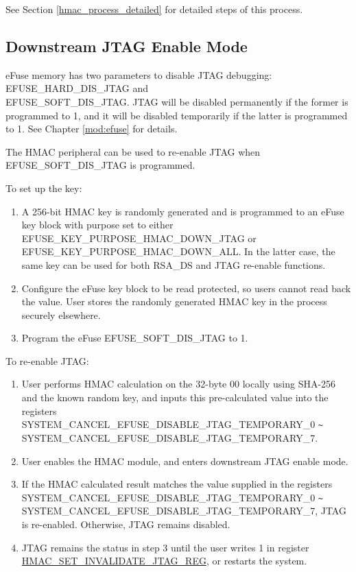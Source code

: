 \documentclass[main\_\_EN.tex]{subfiles}
\begin{document}
See Section \ref{hmac_process_detailed} for detailed steps of this process.


\subsection{Downstream JTAG Enable Mode}

eFuse memory has two parameters to disable JTAG debugging: EFUSE\_HARD\_DIS\_JTAG and\\ EFUSE\_SOFT\_DIS\_JTAG. JTAG will be disabled permanently if the former is programmed to 1, and it will be disabled temporarily if the latter is programmed to 1. See Chapter \ref{mod:efuse} for details.

The HMAC peripheral can be used to re-enable JTAG when EFUSE\_SOFT\_DIS\_JTAG is programmed.

To set up the key:

\begin{enumerate}
\item A 256-bit HMAC key is randomly generated and is programmed to an eFuse key block with purpose set to either EFUSE\_KEY\_PURPOSE\_HMAC\_DOWN\_JTAG or EFUSE\_KEY\_PURPOSE\_HMAC\_DOWN\_ALL.  In the latter case, the same key can be used for both RSA\_DS and JTAG re-enable functions.
\item Configure the eFuse key block to be read protected, so users cannot read back the value. User stores the randomly generated HMAC key in the process securely elsewhere.
\item Program the eFuse EFUSE\_SOFT\_DIS\_JTAG to 1.
\end{enumerate}

To re-enable JTAG:

\begin{enumerate}
\item User performs HMAC calculation on the 32-byte \hexprefix{}00 locally using SHA-256 and the known random key, and inputs this pre-calculated value into the registers SYSTEM\_CANCEL\_EFUSE\_DISABLE\_JTAG\_TEMPORARY\_0 \verb+~+ SYSTEM\_CANCEL\_EFUSE\_DISABLE\_JTAG\_TEMPORARY\_7.
\item User enables the HMAC module, and enters downstream JTAG enable mode.
\item If the HMAC calculated result matches the value supplied in the registers SYSTEM\_CANCEL\_EFUSE\_DISABLE\_JTAG\_TEMPORARY\_0 \verb+~+ SYSTEM\_CANCEL\_EFUSE\_DISABLE\_JTAG\_TEMPORARY\_7, JTAG is re-enabled. Otherwise, JTAG remains disabled.
\item JTAG remains the status in step 3 until the user writes 1 in register \hyperref[regdesc:HMACSETINVALIDATEJTAGREG]{HMAC\_SET\_INVALIDATE\_JTAG\_REG}, or restarts the system.
\end{enumerate}
\end{document}
